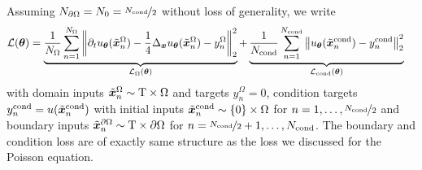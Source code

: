 Assuming $N_{\partial \Omega} = N_0 = \nicefrac{N_{\text{cond}}}{2}$ without loss of generality, we write
\begin{align*}
  {\mathcal{L}}({\bm{\theta}})
  &=
    \underbrace{
    \frac{1}{N_{\Omega}}
    \sum_{n=1}^{N_{\Omega}}
    \left\lVert
    \partial_t u_{{\bm{\theta}}}(\tilde{{\bm{x}}}_n^{\Omega})
    -
    \frac{1}{4} \Delta_{{\bm{x}}} u_{{\bm{\theta}}}(\tilde{{\bm{x}}}_n^{\Omega})
    - y_n^{\Omega}
    \right\rVert^2_2
    }_{{\mathcal{L}}_{\Omega}({\bm{\theta}})}
  +
    \underbrace{
    \frac{1}{N_{\text{cond}}}
    \sum_{n=1}^{N_{\text{cond}}}
    \left\lVert
    u_{{\bm{\theta}}}(\tilde{{\bm{x}}}_n^{\text{cond}})
    -
    y_n^{\text{cond}}
    \right\rVert^2_2
    }_{{\mathcal{L}}_{\text{cond}}({\bm{\theta}})}
\end{align*}
with domain inputs $\tilde{{\bm{x}}}_n^{\Omega} \sim \mathrm{T} \times \Omega$ and targets $y_n^{\Omega} = 0$, condition targets $y_n^{\text{cond}} = u(\tilde{{\bm{x}}}_n^{\text{cond}})$ with initial inputs $\tilde{{\bm{x}}}_n^{\text{cond}} \sim \{0\} \times \Omega$ for $n = 1, \dots, \nicefrac{N_{\text{cond}}}{2}$ and boundary inputs $\tilde{{\bm{x}}}_n^{\partial\Omega} \sim \mathrm{T} \times \partial\Omega$ for $n = \nicefrac{N_{\text{cond}}}{2}+1, \dots, N_{\text{cond}}$.
The boundary and condition loss are of exactly same structure as the loss we discussed for the Poisson equation.

